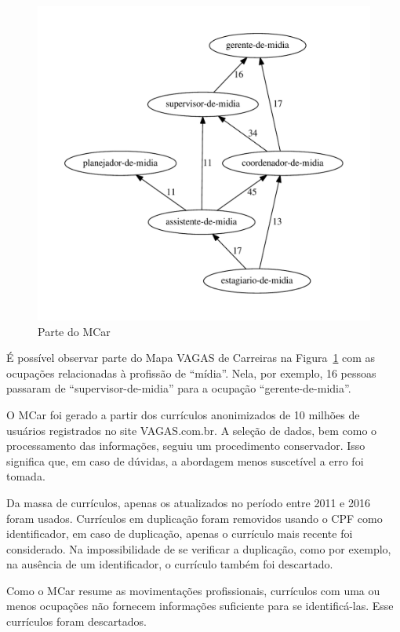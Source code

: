 \documentclass[
  article,
  11pt,
  a4paper,
  english,
  brazil,
  sumario=tradicional]{abntex2}
\begin{document}
\begin{figure}[ht]
  \centering
  \includegraphics[scale=0.6]{cluster_23.pdf}
  \caption{Parte do MCar}
  \label{fig:ex-mapa-midia}
\end{figure}

É possível observar parte do Mapa VAGAS de Carreiras na Figura~\ref{fig:ex-mapa-midia} com as ocupações relacionadas à profissão de \enquote{mídia}. Nela, por exemplo, 16 pessoas passaram de \enquote{supervisor-de-midia} para a ocupação \enquote{gerente-de-midia}.

O MCar foi gerado a partir dos currículos anonimizados de 10 milhões de usuários registrados no site VAGAS.com.br. A seleção de dados, bem como o processamento das informações, seguiu um procedimento conservador. Isso significa que, em caso de dúvidas, a abordagem menos suscetível a erro foi tomada.

Da massa de currículos, apenas os atualizados no período entre 2011 e 2016 foram usados. Currículos em duplicação foram removidos usando o CPF como identificador, em caso de duplicação, apenas o currículo mais recente foi considerado. Na impossibilidade de se verificar a duplicação, como por exemplo, na ausência de um identificador, o currículo também foi descartado.

Como o MCar resume as movimentações profissionais, currículos com uma ou menos ocupações não fornecem informações suficiente para se identificá-las. Esse currículos foram descartados.
\end{document}
